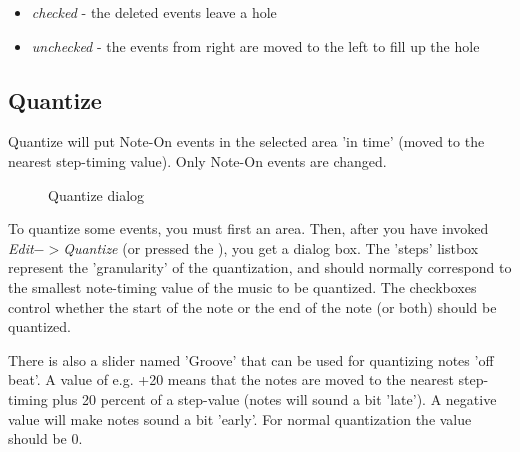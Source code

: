 \documentclass[letterpaper]{report}
\begin{document}
\begin{itemize}
\item {\em checked} - the deleted events leave a hole
\item {\em unchecked} - the events from right are moved to the left to
fill up the hole
\end{itemize}


\subsection{Quantize}\label{quantize}

Quantize will put Note-On events in the selected area 'in time' (moved to the
nearest step-timing value). Only Note-On events are changed.

\begin{figure}
\caption{Quantize dialog}
\end{figure}

To quantize some events, you must first  an area.
Then, after you have invoked {\em Edit$->$Quantize} (or pressed the
), you get a
dialog box. The 'steps' listbox represent the 'granularity' of the
quantization, and should normally correspond to the smallest note-timing
value of the music to be quantized. The checkboxes control whether the
start of the note or the end of the note (or both) should be quantized.

There is also a slider named 'Groove' that can be used for quantizing notes
'off beat'. A value of e.g. +20 means that the notes are moved to the nearest
step-timing plus 20 percent of a step-value (notes will sound a bit 'late'). A
negative value will make notes sound a bit 'early'. For normal quantization
the value should be 0.
\end{document}
